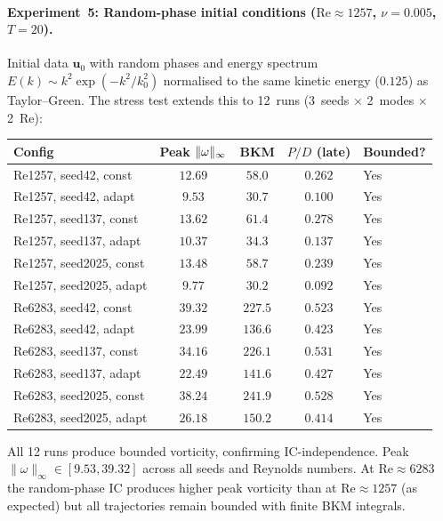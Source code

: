 \paragraph{Experiment~5: Random-phase initial conditions
($\mathrm{Re} \approx 1257$, $\nu = 0.005$, $T = 20$).}
Initial data $\bm{u}_0$ with random phases and energy
spectrum $E(k) \sim k^2 \exp(-k^2/k_0^2)$ normalised
to the same kinetic energy ($0.125$) as Taylor--Green.
The stress test extends this to 12~runs
(3~seeds $\times$ 2~modes $\times$ 2~Re):
\begin{center}
\begin{tabular}{@{}lcccl@{}}
\toprule
Config & Peak $\lVert \omega \rVert_\infty$ & BKM & $P/D$ (late) & Bounded? \\
\midrule
Re1257, seed42, const  & $12.69$ & $58.0$ & $0.262$ & Yes \\
Re1257, seed42, adapt  & $9.53$  & $30.7$ & $0.100$ & Yes \\
Re1257, seed137, const & $13.62$ & $61.4$ & $0.278$ & Yes \\
Re1257, seed137, adapt & $10.37$ & $34.3$ & $0.137$ & Yes \\
Re1257, seed2025, const& $13.48$ & $58.7$ & $0.239$ & Yes \\
Re1257, seed2025, adapt& $9.77$  & $30.2$ & $0.092$ & Yes \\
Re6283, seed42, const  & $39.32$ & $227.5$& $0.523$ & Yes \\
Re6283, seed42, adapt  & $23.99$ & $136.6$& $0.423$ & Yes \\
Re6283, seed137, const & $34.16$ & $226.1$& $0.531$ & Yes \\
Re6283, seed137, adapt & $22.49$ & $141.6$& $0.427$ & Yes \\
Re6283, seed2025, const& $38.24$ & $241.9$& $0.528$ & Yes \\
Re6283, seed2025, adapt& $26.18$ & $150.2$& $0.414$ & Yes \\
\bottomrule
\end{tabular}
\end{center}
All 12 runs produce bounded vorticity, confirming
IC-independence.  Peak $\|\omega\|_\infty \in [9.53, 39.32]$
across all seeds and Reynolds numbers.  At
$\mathrm{Re}\approx 6283$ the random-phase IC produces
higher peak vorticity than at $\mathrm{Re}\approx 1257$
(as expected) but all trajectories remain bounded with
finite BKM integrals.

